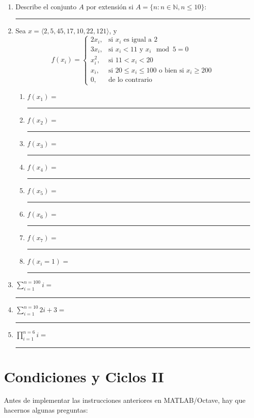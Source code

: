 \documentclass[spanish, 10pt]{article}
\newcommand{\responserule}{{\large\rule{14 cm}{0.3mm}}}
\newcommand{\shortresponserule}{{\large\rule{5 cm}{0.3mm}}}
\begin{document}
\begin{enumerate}
    \itemsep2.5ex
    \item Describe el conjunto $A$ por extensión si $A = \{ n : n \in \mathbb{N}, n \leq 10 \}$: \\[3ex] \responserule
    \item Sea $x = \langle 2, 5, 45, 17, 10, 22, 121 \rangle$, y 
    $$f(x_i) =
        \begin{cases}
            2x_i, & \text{si } x_i \text{ es igual a } 2 \\
            3x_i, & \text{si } x_i < 11 \text{ y } x_i \mod 5 = 0 \\
            x_i^2, & \text{si } 11 < x_i < 20 \\
            x_i, & \text{si } 20 \leq x_i \leq 100 \text{ o bien si } x_i \geq 200 \\
            0, & \text{de lo contrario}
        \end{cases}$$
        \bigskip
    \begin{enumerate}
        \item $f(x_1) =$ \quad \; \shortresponserule
        \item $f(x_2) =$ \quad \; \shortresponserule
        \item $f(x_3) =$ \quad \; \shortresponserule
        \item $f(x_4) =$ \quad \; \shortresponserule
        \item $f(x_5) =$ \quad \; \shortresponserule
        \item $f(x_6) =$ \quad \; \shortresponserule
        \item $f(x_7) =$ \quad \; \shortresponserule
        \item $f(x_i=1) =$ \shortresponserule
    \end{enumerate}
    \item {\Large $\sum \limits_{i=1}^{n=100} i =$} \hfill \shortresponserule
    \item {\Large $\sum \limits_{i=1}^{n=10} 2i + 3 =$} \hfill \shortresponserule
    \item {\Large $\prod \limits_{i=1}^{n=6} i =$} \hfill \shortresponserule
\end{enumerate}

\section{Condiciones y Ciclos II}

Antes de implementar las instrucciones anteriores en MATLAB/Octave, hay que hacernos algunas preguntas:
\end{document}
